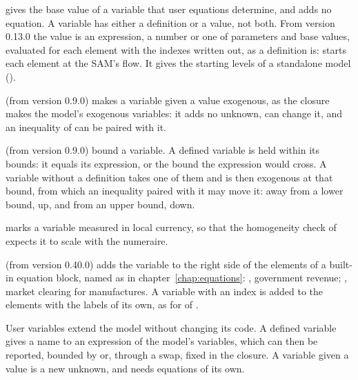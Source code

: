 
\begin{optdesc}
\item[\optarg{}{value}{expression}] gives the base value of a variable that
user equations determine, and adds no equation. A variable has either a
definition or a value, not both. From version 0.13.0 the value is an
expression, a number or one of parameters and base values, evaluated for each
element with the indexes written out, as a definition is:  starts each element at the SAM's flow. It gives
the starting levels of a standalone model ().

\item[\opt{}{fixed}] (from version 0.9.0) makes a variable given a value
exogenous, as the closure makes the model's exogenous variables: it adds no
unknown,  can change it, and an inequality of
 can be paired with it.

\item[\optarg{}{lower}{\#}, \optarg{}{upper}{\#}] (from version 0.9.0) bound a
variable. A defined variable is held within its bounds: it equals its
expression, or the bound the expression would cross. A variable without a
definition takes one of them and is then exogenous at that bound, from which
an inequality paired with it may move it: away from a lower bound, up, and
from an upper bound, down.

\item[\opt{}{nominal}] marks a variable measured in local currency, so that
the homogeneity check of  expects it to scale with the
numeraire.

\item[\optarg{}{add}{block}] (from version 0.40.0) adds the variable to the
right side of the elements of a built-in equation block, named as in
chapter~\ref{chap:equations}: , government revenue;
, market clearing for manufactures. A variable with an
index is added to the elements with the labels of its own, as for
 of .
\end{optdesc}


User variables extend the model without changing its code. A defined variable
gives a name to an expression of the model's variables, which can then be
reported, bounded by  or, through a swap, fixed in the
closure. A variable given a value is a new unknown, and needs equations of its
own.

